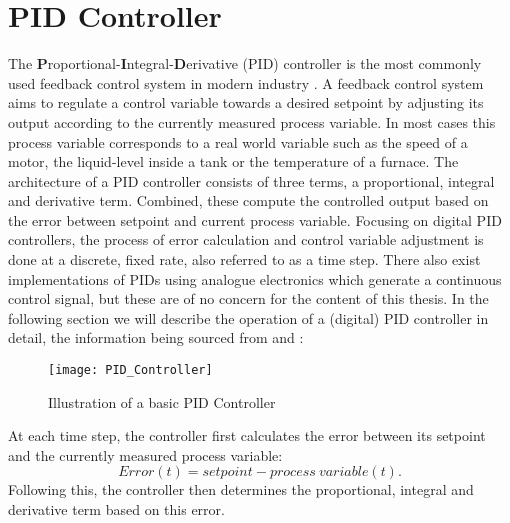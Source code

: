 \section{PID Controller}
The \textbf{P}roportional-\textbf{I}ntegral-\textbf{D}erivative (PID) controller is the most commonly used feedback control system in modern industry \parencite{aastrom2002control}.
A feedback control system aims to regulate a control variable towards a desired setpoint by adjusting its output according to the currently measured process variable.
In most cases this process variable corresponds to a real world variable such as the speed of a motor, the liquid-level inside a tank or the temperature of a furnace.
The architecture of a PID controller consists of three terms, a proportional, integral and derivative term.
Combined, these compute the controlled output based on the error between setpoint and current process variable.
Focusing on digital PID controllers, the process of error calculation and control variable adjustment is done at a discrete, fixed rate, also referred to as a time step.
There also exist implementations of PIDs using analogue electronics which generate a continuous control signal, but these are of no concern for the content of this thesis\parencite{MATLAB_PID_playlist,TLK_Energy_PID_Explanations}.
In the following section we will describe the operation of a (digital) PID controller in detail, the information being sourced from \cite{MATLAB_PID_playlist} and \cite{TLK_Energy_PID_Explanations}:

\begin{figure}[h]
	\centerline{\texttt{[image: PID\_Controller]}}
	\caption[PID controller illustration]{Illustration of a basic PID Controller}
	\label{figure: PID Controller}
\end{figure}


At each time step, the controller first calculates the error between its setpoint and the currently measured process variable: 
\[
	Error(t) = setpoint - process\ variable(t)
.\]
Following this, the controller then determines the proportional, integral and derivative term based on this error.

